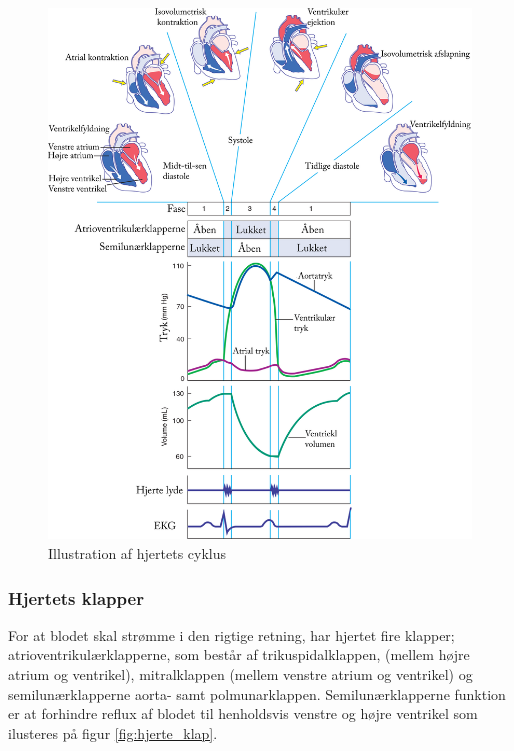 \begin{figure}[H] %
\begin{center}
\includegraphics[width=1\textwidth]{figures/cyklus}
\end{center}
\caption{Illustration af hjertets cyklus\cite{cindy}}
\label{fig:hjerte_cyklus}
\end{figure}

\subsubsection{Hjertets klapper}
For at blodet skal strømme i den rigtige retning, har hjertet fire klapper; atrioventrikulærklapperne, som består af trikuspidalklappen, (mellem højre atrium og ventrikel), mitralklappen (mellem venstre atrium og ventrikel) og semilunærklapperne aorta- samt polmunarklappen. Semilunærklapperne funktion er at forhindre reflux af blodet til henholdsvis venstre og højre ventrikel som ilusteres på figur \ref{fig:hjerte_klap}.  \cite{gronanatomi}  

